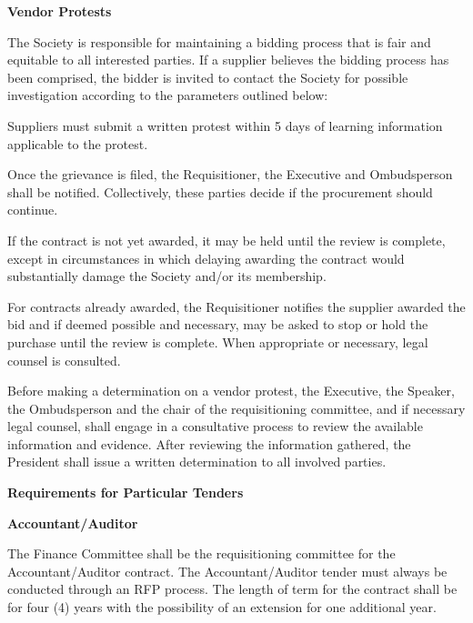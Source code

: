 \begin{longenum}[label*=\thesection.\arabic*., align=left]
\item \textbf{Vendor Protests}
\begin{longenum} [label*=\arabic*., align=left]


\item The Society is responsible for maintaining a bidding process that is fair and equitable to all interested parties. If a supplier believes the bidding process has been comprised, the bidder is invited to contact the Society for possible investigation according to the parameters outlined below:

\item Suppliers must submit a written protest within 5 days of learning information applicable to the protest.

\item Once the grievance is filed, the Requisitioner, the Executive and Ombudsperson shall be notified. Collectively, these parties decide if the procurement should continue. 

\item If the contract is not yet awarded, it may be held until the review is complete, except in circumstances in which delaying awarding the contract would substantially damage the Society and/or its membership. 

\item For contracts already awarded, the Requisitioner notifies the supplier awarded the bid and if deemed possible and necessary, may be asked to stop or hold the purchase until the review is complete. When appropriate or necessary, legal counsel is consulted.

\item Before making a determination on a vendor protest, the Executive, the Speaker, the Ombudsperson and the chair of the requisitioning committee, and if necessary legal counsel, shall engage in a consultative process to review the available information and evidence. After reviewing the information gathered, the President shall issue a written determination to all involved parties.
\end{longenum}

\item \textbf{Requirements for Particular Tenders}

\begin{longenum} [label*=\arabic*., align=left]
		\item  \textbf{Accountant/Auditor}
		\begin{longenum} [label*=\arabic*., align=left]
			\item The Finance Committee shall be the requisitioning committee for the Accountant/Auditor contract. The Accountant/Auditor tender must always be conducted through an RFP process. The length of term for the contract shall be for four (4) years with the possibility of an extension for one additional year.
			

\end{longenum}
\end{longenum}
\end{longenum}
